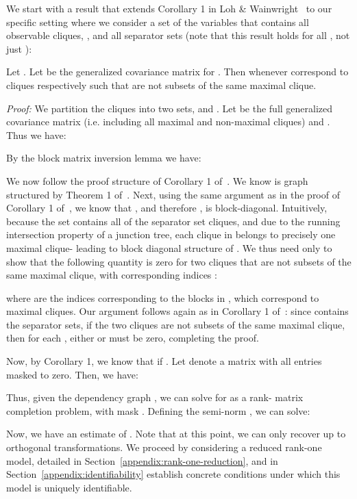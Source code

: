 \documentclass[letterpaper]{article}
\begin{document}
\begin{appendix}
We start with a result that extends Corollary 1 in Loh \& Wainwright~\cite{loh2012structure} to our specific setting where we consider a set of the variables that contains all observable cliques, , and all separator sets  (note that this result holds for all , not just ):

\begin{corollary}
	\label{cor:o-h-partition}
	Let .
	Let  be the generalized covariance matrix for .
	Then  whenever  correspond to cliques  respectively such that  are not subsets of the same maximal clique.
\end{corollary}
\textit{Proof:}
We partition the cliques  into two sets,  and .
Let  be the full generalized covariance matrix (i.e. including all maximal and non-maximal cliques) and .
Thus we have:

By the block matrix inversion lemma we have:

We now follow the proof structure of Corollary 1 of~\cite{loh2012structure}.
We know  is graph structured by Theorem 1 of~\cite{loh2012structure}.
Next, using the same argument as in the proof of Corollary 1 of~\cite{loh2012structure}, we know that , and therefore , is block-diagonal.
Intuitively, because the set  contains all of the separator set cliques, and due to the running intersection property of a junction tree, each clique in  belongs to precisely one maximal clique- leading to block diagonal structure of .
We thus need only to show that the following quantity is zero for two cliques  that are not subsets of the same maximal clique, with corresponding indices :

where  are the indices corresponding to the blocks in , which correspond to maximal cliques.
Our argument follows again as in Corollary 1 of~\cite{loh2012structure}: since  contains the separator sets, if the two cliques  are not subsets of the same maximal clique, then for each , either  or  must be zero, completing the proof.

Now, by Corollary 1, we know that  if .
Let  denote a matrix  with all entries  masked to zero.
Then, we have:


Thus, given the dependency graph , we can solve for  as a rank- matrix completion problem, with mask .
Defining the semi-norm , we can solve:


Now, we have an estimate of .
Note that at this point, we can only recover  up to orthogonal transformations.
We proceed by considering a reduced rank-one model, detailed in Section~\ref{appendix:rank-one-reduction}, and in Section~\ref{appendix:identifiability} establish concrete conditions under which this model is uniquely identifiable.


\end{appendix}
\end{document}
